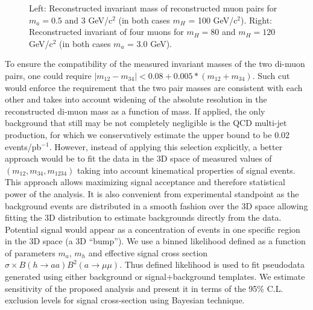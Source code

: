 \documentclass[aps,prl,nofootinbib,superscriptaddress]{revtex4}
\begin{document}
\begin{figure*}[htb]
\begin{center}
\caption{Left: Reconstructed invariant mass of reconstructed muon pairs for $m_a=0.5$ and 
3 GeV/c$^2$ (in both cases $m_H$ = 100 GeV/c$^2$). Right: Reconstructed invariant of four muons for 
$m_H=80$ and $m_H=120$ GeV/c$^2$ (in both cases $m_a$ = 3.0 GeV).}
\label{muon_pairs_masses_invariant_mass}
\end{center}
\end{figure*}

To ensure the compatibility of the measured invariant masses of the two di-muon pairs, one could 
require $|m_{12}-m_{34}|<0.08+0.005*(m_{12}+m_{34})$. Such cut would enforce the requirement 
that the two pair masses are consistent with each other and takes into account widening of the 
absolute resolution in the reconstructed di-muon mass as a function of mass. If applied, the 
only background that still may be not completely negligible is the QCD multi-jet production, 
for which we conservatively estimate the upper bound to be 0.02 events/pb$^{-1}$. However, 
instead of applying this selection explicitly, a better approach would be to fit the data in 
the 3D space of measured values of $(m_{12},m_{34}, m_{1234})$ taking into account
kinematical properties of signal events. This approach allows maximizing signal
acceptance and therefore statistical power of the analysis. It is also convenient from 
experimental standpoint as the background events are distributed in a smooth fashion over the 
3D space allowing fitting the 3D distribution to estimate backgrounds directly from the data. 
Potential signal would appear as a concentration of events in one specific region in the 3D 
space (a 3D ``bump''). We use a binned likelihood defined as a function of parameters $m_a$, 
$m_h$ and effective signal cross section $\sigma \times B (h \to aa) B^2(a \to \mu \mu)$. 
Thus defined likelihood is used to fit pseudodata generated using either background or 
signal+background templates. We estimate sensitivity of the proposed analysis and present 
it in terms of the 95\% C.L. exclusion levels for signal cross-section using Bayesian 
technique.
\end{document}
